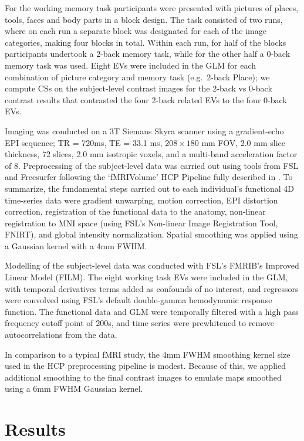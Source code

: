 For the working memory task participants were presented with pictures of places, tools, faces and body parts in a block design. The task consisted of two runs, where on each run a separate block was designated for each of the image categories, making four blocks in total. Within each run, for half of the blocks participants undertook a 2-back memory task, while for the other half a 0-back memory task was used. Eight EVs were included in the GLM for each combination of picture category and memory task (e.g.\ 2-back Place); we compute CSs on the subject-level contrast images for the 2-back vs 0-back contrast results that contrasted the four 2-back related EVs to the four 0-back EVs.

Imaging was conducted on a 3T Siemans Skyra scanner using a gradient-echo EPI sequence; TR = 720ms, TE = 33.1 ms, $208\times180$ mm FOV, 2.0 mm slice thickness, 72 slices, 2.0 mm isotropic voxels, and a multi-band acceleration factor of 8. Preprocessing of the subject-level data was carried out using tools from FSL and Freesurfer following the `fMRIVolume' HCP Pipeline fully described in \citet{Glasser2013-qc}. To summarize, the fundamental steps carried out to each individual's functional 4D time-series data were gradient unwarping, motion correction, EPI distortion correction, registration of the functional data to the anatomy, non-linear registration to MNI space (using FSL's Non-linear Image Registration Tool, FNIRT), and global intensity normalization. Spatial smoothing was applied using a Gaussian kernel with a 4mm FWHM. 

Modelling of the subject-level data was conducted with FSL's FMRIB's Improved Linear Model (FILM). The eight working task EVs were included in the GLM, with temporal derivatives terms added as confounds of no interest, and regressors were convolved using FSL's default double-gamma hemodynamic response function. The functional data and GLM were temporally filtered with a high pass frequency cutoff point of 200s, and time series were prewhitened to remove autocorrelations from the data.

In comparison to a typical fMRI study, the 4mm FWHM smoothing kernel size used in the HCP preprocessing pipeline is modest. Because of this, we applied additional smoothing to the final contrast images to emulate maps smoothed using a 6mm FWHM Gaussian kernel.

\section{Results}
\label{sec:Results}
